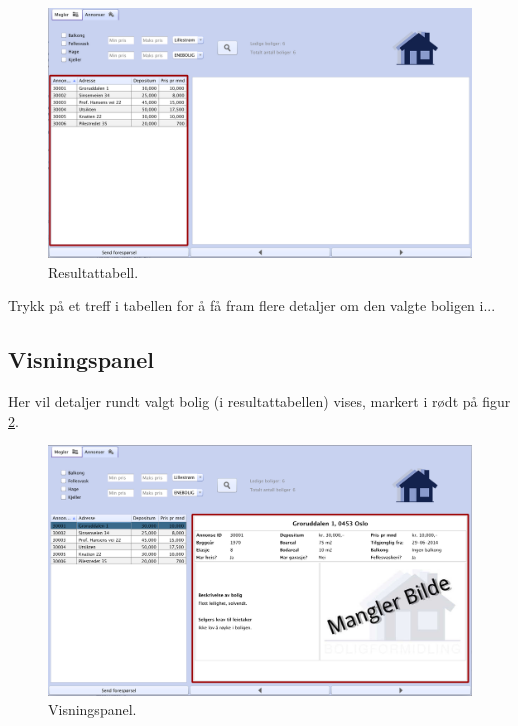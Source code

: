 \begin{figure}[h!]
 \includegraphics[width=\textwidth,height=\textheight,keepaspectratio]{./img/brukerveiledning/3.png}
 \caption{Resultattabell.}
 \label{fig:bv:3}
\end{figure}

Trykk på et treff i tabellen for å få fram flere detaljer om den valgte boligen i...




\newpage
\subsection{Visningspanel}

Her vil detaljer rundt valgt bolig (i resultattabellen) vises, markert i rødt på figur \ref{fig:bv:4}.


\begin{figure}[h!]
 \includegraphics[width=\textwidth,height=\textheight,keepaspectratio]{./img/brukerveiledning/4.png}
 \caption{Visningspanel.}
 \label{fig:bv:4}
\end{figure}







